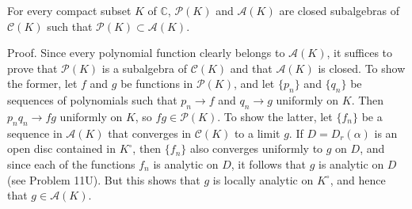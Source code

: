 For every compact subset $K$ of $\mathbb{C}$, $\mathcal{P}(K)$ and $\mathcal{A}(K)$ are closed subalgebras of $\mathcal{C}(K)$ such that $\mathcal{P}(K) \subset \mathcal{A}(K)$.

Proof. Since every polynomial function clearly belongs to $\mathcal{A}(K)$, it suffices to prove that $\mathcal{P}(K)$ is a subalgebra of $\mathcal{C}(K)$ and that $\mathcal{A}(K)$ is closed. To show the former, let $f$ and $g$ be functions in $\mathcal{P}(K)$, and let $\{p_n\}$ and $\{q_n\}$ be sequences of polynomials such that $p_n \rightarrow f$ and $q_n \rightarrow g$ uniformly on $K$. Then $p_n q_n \rightarrow fg$ uniformly on $K$, so $fg \in \mathcal{P}(K)$. To show the latter, let $\{f_n\}$ be a sequence in $\mathcal{A}(K)$ that converges in $\mathcal{C}(K)$ to a limit $g$. If $D = D_r(\alpha)$ is an open disc contained in $K^\circ$, then $\{f_n\}$ also converges uniformly to $g$ on $D$, and since each of the functions $f_n$ is analytic on $D$, it follows that $g$ is analytic on $D$ (see Problem 11U). But this shows that $g$ is locally analytic on $K^\circ$, and hence that $g \in \mathcal{A}(K)$.

